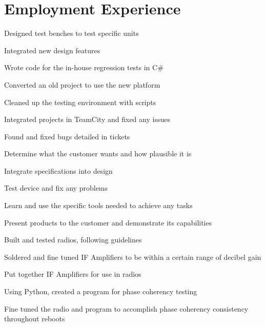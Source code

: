 \documentclass[]{deedy-resume-openfont}
\begin{document}
\hfill
\begin{minipage}[t]{0.66\textwidth} 


\section{Employment Experience}

\vspace{\topsep} %
\begin{tightemize}
\item Designed test benches to test specific units \item Integrated new design features \item Wrote code for the in-house regression tests in C# \item Converted an old project to use the new platform \item Cleaned up the testing environment with scripts \item Integrated projects in TeamCity and fixed any issues \item Found and fixed bugs detailed in tickets
\end{tightemize}
\sectionsep

\begin{tightemize}
\item Determine what the customer wants and how plausible it is \item Integrate specifications into design \item Test device and fix any problems \item Learn and use the specific tools needed to achieve any tasks \item Present products to the customer and demonstrate its capabilities
\end{tightemize}
\sectionsep

\begin{tightemize}
\item Built and tested radios, following guidelines \item Soldered and fine tuned IF Amplifiers to be within a certain range of decibel gain \item Put together IF Amplifiers for use in radios \item Using Python, created a program for phase coherency testing \item Fine tuned the radio and program to accomplish phase coherency consistency throughout reboots 
\end{tightemize}
\sectionsep


\end{minipage}
\end{document}
